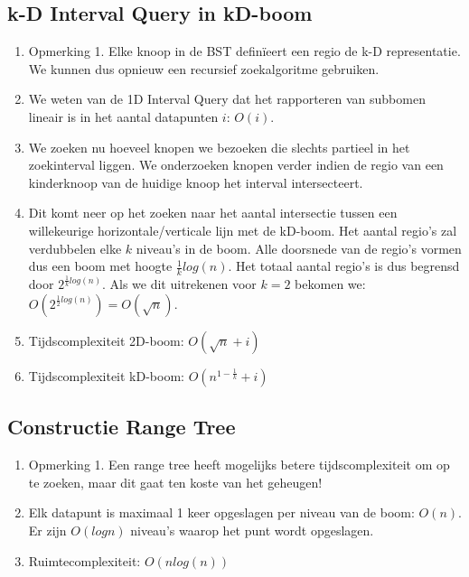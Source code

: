 \documentclass[12pt,a4paper]{article}
\begin{document}
		\subsection{k-D Interval Query in kD-boom}
		\begin{enumerate}
			\item Opmerking 1. Elke knoop in de BST definïeert een regio de k-D representatie. We kunnen dus opnieuw een recursief zoekalgoritme gebruiken. 
			\item We weten van de 1D Interval Query dat het rapporteren van subbomen lineair is in het aantal datapunten $i$: $O(i)$. 
			\item We zoeken nu hoeveel knopen we bezoeken die slechts partieel in het zoekinterval liggen. We onderzoeken knopen verder indien de regio van een kinderknoop van de huidige knoop het interval intersecteert. 
			\item Dit komt neer op het zoeken naar het aantal intersectie tussen een willekeurige horizontale/verticale lijn met de kD-boom. Het aantal regio's zal verdubbelen elke $k$ niveau's in de boom. Alle doorsnede van de regio's vormen dus een boom met hoogte $\frac{1}{k}log (n)$. Het totaal aantal regio's is dus begrensd door $2^{\frac{1}{k}log (n)}$. Als we dit uitrekenen voor $k = 2$ bekomen we: $O(2^{\frac{1}{2}log (n)}) = O(\sqrt{n})$.
			\item Tijdscomplexiteit 2D-boom: $O(\sqrt{n} + i)$
			\item Tijdscomplexiteit kD-boom: $O(n^{1-\frac{1}{k}} + i)$
		\end{enumerate}
	
		\subsection{Constructie Range Tree}
		\begin{enumerate}
			\item Opmerking 1. Een range tree heeft mogelijks betere tijdscomplexiteit om op te zoeken, maar dit gaat ten koste van het geheugen!
			\item Elk datapunt is maximaal 1 keer opgeslagen per niveau van de boom: $O(n)$. Er zijn $O(log n)$ niveau's waarop het punt wordt opgeslagen.
			\item Ruimtecomplexiteit: $O(n log (n))$ 
		\end{enumerate}
	
\end{document}
